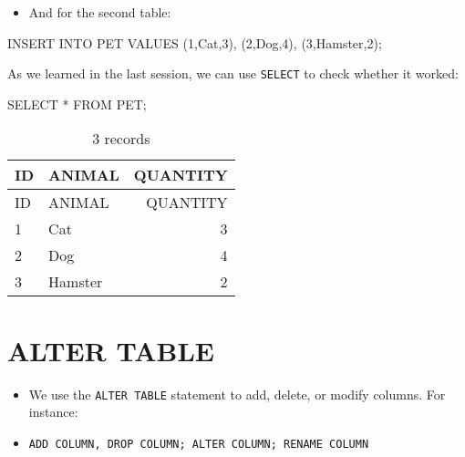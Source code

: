 \documentclass[
  letterpaper,
  DIV=11,
  numbers=noendperiod]{scrreprt}
\newenvironment{Shaded}{\begin{snugshade}}{\end{snugshade}}
\newcommand{\DecValTok}[1]{\textcolor[rgb]{0.68,0.00,0.00}{#1}}
\newcommand{\KeywordTok}[1]{\textcolor[rgb]{0.00,0.23,0.31}{#1}}
\newcommand{\NormalTok}[1]{\textcolor[rgb]{0.00,0.23,0.31}{#1}}
\newcommand{\OperatorTok}[1]{\textcolor[rgb]{0.37,0.37,0.37}{#1}}
\newcommand{\StringTok}[1]{\textcolor[rgb]{0.13,0.47,0.30}{#1}}
\providecommand{\tightlist}{%
  \setlength{\itemsep}{0pt}\setlength{\parskip}{0pt}}\usepackage{longtable,booktabs,array}
\begin{document}
\begin{itemize}
\tightlist
\item
  And for the second table:
\end{itemize}

\begin{Shaded}
\begin{Highlighting}[]
\KeywordTok{INSERT} \KeywordTok{INTO}\NormalTok{ PET }\KeywordTok{VALUES}
\NormalTok{    (}\DecValTok{1}\NormalTok{,}\StringTok{\textquotesingle{}Cat\textquotesingle{}}\NormalTok{,}\DecValTok{3}\NormalTok{),}
\NormalTok{    (}\DecValTok{2}\NormalTok{,}\StringTok{\textquotesingle{}Dog\textquotesingle{}}\NormalTok{,}\DecValTok{4}\NormalTok{),}
\NormalTok{    (}\DecValTok{3}\NormalTok{,}\StringTok{\textquotesingle{}Hamster\textquotesingle{}}\NormalTok{,}\DecValTok{2}\NormalTok{);}
\end{Highlighting}
\end{Shaded}

As we learned in the last session, we can use \texttt{SELECT} to check
whether it worked:

\begin{Shaded}
\begin{Highlighting}[]
\KeywordTok{SELECT} \OperatorTok{*} \KeywordTok{FROM}\NormalTok{ PET;}
\end{Highlighting}
\end{Shaded}

\begin{longtable}[]{@{}llr@{}}
\caption{3 records}\tabularnewline
\toprule()
ID & ANIMAL & QUANTITY \\
\midrule()
\endfirsthead
\toprule()
ID & ANIMAL & QUANTITY \\
\midrule()
\endhead
1 & Cat & 3 \\
2 & Dog & 4 \\
3 & Hamster & 2 \\
\bottomrule()
\end{longtable}

\hypertarget{alter-table}{%
\section{ALTER TABLE}\label{alter-table}}

\begin{itemize}
\tightlist
\item
  We use the \texttt{ALTER\ TABLE} statement to add, delete, or modify
  columns. For instance:
\item
  \texttt{ADD\ COLUMN,\ DROP\ COLUMN;\ ALTER\ COLUMN;\ RENAME\ COLUMN}
\end{itemize}
\end{document}
